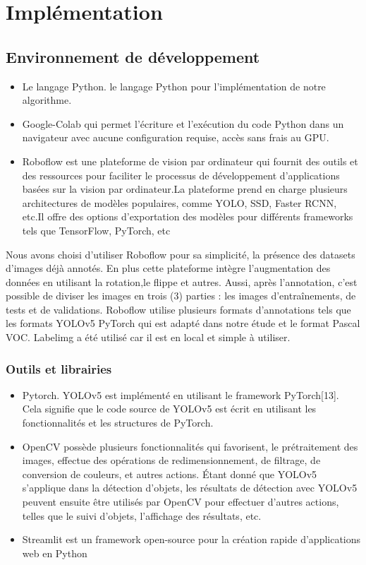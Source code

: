 \documentclass{article}
\begin{document}
	
	\section{Implémentation}
	\subsection{Environnement de développement}
	\begin{itemize}
		\item Le langage Python. le langage Python pour l’implémentation de
		notre algorithme.
		\item Google-Colab qui permet l’écriture et l’exécution du code Python dans un navigateur avec aucune configuration
		requise, accès sans frais au GPU.
		\item Roboflow est une plateforme de vision par ordinateur qui fournit des outils et des ressources
		pour faciliter le processus de développement d’applications basées sur la vision par ordinateur.La plateforme prend en charge
		plusieurs architectures de modèles populaires, comme YOLO, SSD, Faster RCNN, etc.Il offre des options d’exportation des
		modèles pour différents frameworks tels que TensorFlow, PyTorch, etc
	\end{itemize}
	
	Nous avons choisi d’utiliser Roboflow pour sa simplicité, la présence des datasets d’images
	déjà annotés. En plus cette plateforme intègre l’augmentation des données en utilisant la rotation,le
	flippe et autres. Aussi, après l’annotation, c’est possible de diviser les images en trois (3) parties : les
	images d’entraînements, de tests et de validations. Roboflow utilise plusieurs formats d’annotations
	tels que les formats YOLOv5 PyTorch qui est adapté dans notre étude et le format Pascal VOC.
	Labelimg a été utilisé car il est en local et simple à utiliser.
	
	\subsubsection{Outils et librairies}
	\begin{itemize}
		\item Pytorch. YOLOv5 est implémenté en utilisant le framework PyTorch[13].
		Cela signifie que le code source de YOLOv5 est écrit en utilisant les fonctionnalités et les structures
		de PyTorch.
		\item OpenCV possède plusieurs fonctionnalités qui favorisent, le prétraitement des images, effectue
		des opérations de redimensionnement, de filtrage, de conversion de couleurs, et autres actions. Étant
		donné que YOLOv5 s’applique dans la détection d’objets, les résultats de détection avec YOLOv5
		peuvent ensuite être utilisés par OpenCV pour effectuer d’autres actions, telles que le suivi d’objets,
		l’affichage des résultats, etc.
		\item Streamlit est un framework open-source pour la création rapide d’applications web en Python
		
	\end{itemize}
	
\end{document}
